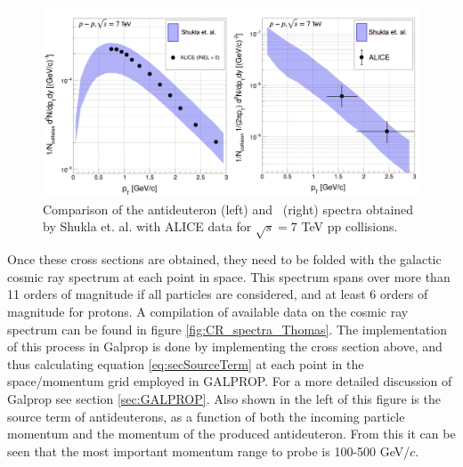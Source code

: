 \begin{figure}[htbp]
    \centering
    \includegraphics[width=\textwidth]{figures/production_xs_ALICE_comparison.png}
    \caption{Comparison of the antideuteron (left) and \ahe\ (right) spectra obtained by Shukla et. al. with ALICE data for $\sqrt{s}=7$ TeV pp collisions.}
    \label{fig:prod_v_ALICE}
\end{figure}

Once these cross sections are obtained, they need to be folded with the galactic cosmic ray spectrum at each point in space. This spectrum spans over more than 11 orders of magnitude if all particles are considered, and at least 6 orders of magnitude for protons. A compilation of available data on the cosmic ray spectrum can be found in figure \ref{fig:CR_spectra_Thomas}. The implementation of this process in Galprop is done by implementing the cross section above, and thus calculating equation \ref{eq:secSourceTerm} at each point in the space/momentum grid employed in GALPROP. For a more detailed discussion of Galprop see section \ref{sec:GALPROP}. Also shown in the left of this figure is the source term of antideuterons, as a function of both the incoming particle momentum and the momentum of the produced antideuteron. From this it can be seen that the most important momentum range to probe is 100-500 GeV/$c$. 

